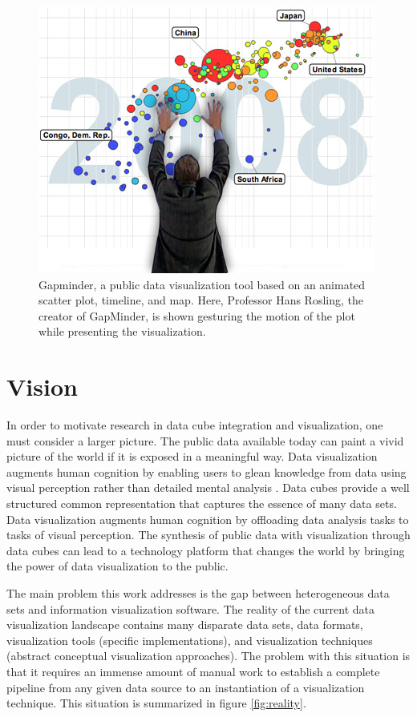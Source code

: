 \documentclass[12pt]{article}
\begin{document}
\begin{doublespace}
\begin{figure}[h!]
  \centering
  \includegraphics[width=\textwidth]{figures/gapminder.jpg}
  \caption[GapMinder and Hans Rosling.]
   {Gapminder, a public data visualization tool based on an animated scatter plot, timeline, and map. Here, Professor Hans Rosling, the creator of GapMinder, is shown gesturing the motion of the plot while presenting the visualization.}
  \label{fig:gapminder}
\end{figure}
\pagebreak
\section{Vision}
In order to motivate research in data cube integration and visualization, one must consider a larger picture. The public data available today can paint a vivid picture of the world if it is exposed in a meaningful way. Data visualization augments human cognition by enabling users to glean knowledge from data using visual perception rather than detailed mental analysis \cite{card1999readings}. Data cubes provide a well structured common representation that captures the essence of many data sets. Data visualization augments human cognition by offloading data analysis tasks to tasks of visual perception. The synthesis of public data with visualization through data cubes can lead to a technology platform that changes the world by bringing the power of data visualization to the public.

The main problem this work addresses is the gap between heterogeneous data sets and information visualization software. The reality of the current data visualization landscape contains many disparate data sets, data formats, visualization tools (specific implementations), and visualization techniques (abstract conceptual visualization approaches). The problem with this situation is that it requires an immense amount of manual work to establish a complete pipeline from any given data source to an instantiation of a visualization technique. This situation is summarized in figure \ref{fig:reality}.


\end{doublespace}
\end{document}

